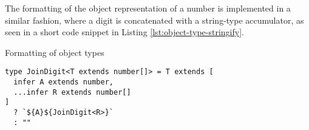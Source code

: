 The formatting of the object representation of a number is implemented in a similar fashion, where a digit is concatenated with a string-type accumulator, as seen in a short code snippet in Listing \ref{lst:object-type-stringify}.

\begin{listing}[ht]
  \caption{Formatting of object types}\label{lst:object-type-stringify}
  \begin{verbatim}
type JoinDigit<T extends number[]> = T extends [
  infer A extends number,
  ...infer R extends number[]
]
  ? `${A}${JoinDigit<R>}`
  : ""
\end{verbatim}
\end{listing}